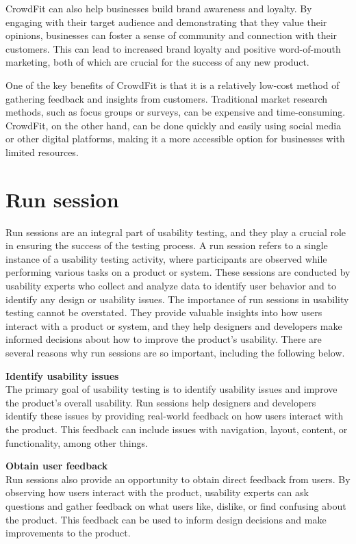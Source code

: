 CrowdFit can also help businesses build brand awareness and loyalty. By engaging with their target audience and demonstrating that they 
value their opinions, businesses can foster a sense of community and connection with their customers. This can lead to increased brand 
loyalty and positive word-of-mouth marketing, both of which are crucial for the success of any new product.

One of the key benefits of CrowdFit is that it is a relatively low-cost method of gathering feedback and insights from customers. 
Traditional market research methods, such as focus groups or surveys, can be expensive and time-consuming. CrowdFit, on the other hand, 
can be done quickly and easily using social media or other digital platforms, making it a more accessible option for businesses with limited resources.

\section{Run session}
Run sessions are an integral part of usability testing, and they play a crucial role in ensuring the success of the testing process. 
A run session refers to a single instance of a usability testing activity, where participants are observed while performing various 
tasks on a product or system. These sessions are conducted by usability experts who collect and analyze data to identify user behavior 
and to identify any design or usability issues.
The importance of run sessions in usability testing cannot be overstated. They provide valuable insights into how users interact with a 
product or system, and they help designers and developers make informed decisions about how to improve the product's usability. 
There are several reasons why run sessions are so important, including the following below.

\textbf{Identify usability issues}\\
The primary goal of usability testing is to identify usability issues and improve the product's overall usability. 
Run sessions help designers and developers identify these issues by providing real-world feedback on how users interact 
with the product. This feedback can include issues with navigation, layout, content, or functionality, among other things.

\textbf{Obtain user feedback}\\
Run sessions also provide an opportunity to obtain direct feedback from users. By observing how users interact 
with the product, usability experts can ask questions and gather feedback on what users like, dislike, or find 
confusing about the product. This feedback can be used to inform design decisions and make improvements to the product.

